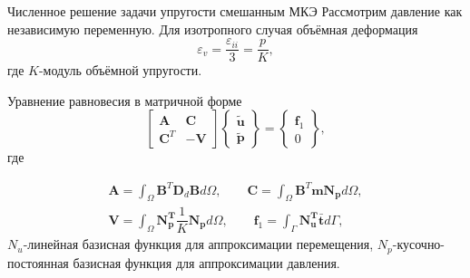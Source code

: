 \documentclass{beamer}
\begin{document}
\begin{frame}{Численное решение задачи упругости смешанным МКЭ}
\small
Рассмотрим давление как независимую переменную. Для изотропного случая объёмная деформация 
\begin{equation*}
\varepsilon_v=\dfrac{\varepsilon_{ii}}{3}=\dfrac{p}{K}, 
\end{equation*}
где $K$-модуль объёмной упругости. 

Уравнение равновесия в матричной форме
\begin{equation*}
\begin{bmatrix}
\mathbf{A} & \mathbf{C} \\
\mathbf{C}^{T} & -\mathbf{V} 
\end{bmatrix}
\begin{Bmatrix}
\tilde{\mathbf{u}} \\
\tilde{\mathbf{p}} 
\end{Bmatrix}
=
\begin{Bmatrix}
\mathbf{f}_1 \\
0
\end{Bmatrix},
\end{equation*}
где

\begin{equation*}
\begin{split}
\mathbf{A}=\int_{\Omega} {\mathbf{B}^{T} \mathbf{D}_{d} \mathbf{B} d\Omega}, \qquad \mathbf{C}=\int_{\Omega} {\mathbf{B}^{T} \mathbf{m} \mathbf{N_{p}} d\Omega},\\
\mathbf{V}=\int_{\Omega} {\mathbf{N_{p}^{T}} \dfrac{1}{K} \mathbf{N_{p}} d\Omega}, \qquad \mathbf{f}_1=\int_{\Gamma} {\mathbf{N_{u}^{T}} \bar{\mathbf{t}}d\Gamma},
\end{split}
\end{equation*}
$N_u$-линейная базисная функция для аппроксимации перемещения, $N_p$-кусочно-постоянная базисная функция для аппроксимации давления.
\end{frame}
\end{document}
